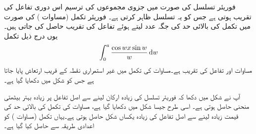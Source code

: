 فوریئر تسلسل کی صورت میں جزوی مجموعوں کی ترسیم اس دوری تفاعل کی تقریب ہوتی ہے جس کو یہ تسلسل ظاہر کرتی ہے۔ فوریئر تکمل (مساوات ) کی صورت میں تکمل کی بالائی حد  کی جگہ عدد  لیتے ہوئے تفاعل کی تقریب حاصل کی جاتی ہیں۔یوں درج ذیل تکمل
\begin{align}\label{مساوات_فوریئر_گبس_الف}
\int_0^a \frac{\cos wx\sin w}{w}\dif w
\end{align}
مساوات  اور تفاعل  کی تقریب ہے۔مساوات  کی تکمل میں غیر استمراری نقطہ کے قریب  ارتعاش پایا جاتا ہے جس کو شکل  میں دکھایا گیا ہے۔

آپ نے  شکل  میں دکھا کہ فوریئر تسلسل کی زیادہ ارکان لینے سے اصل تفاعل  پر زیادہ بہتر بیٹھتی منحنی حاصل ہوتی ہے۔ اسی طرح جیسا شکل  میں دکھایا گیا ہے، مساوات  کی تکمل کی بالائی حد  کی قیمت زیادہ لینے سے اصل تفاعل  کی زیادہ یکساں شکل حاصل ہوتی ہے۔یہاں تکمل (مساوات ) کو اعدادی طریقہ سے حاصل کیا گیا ہے۔ 

